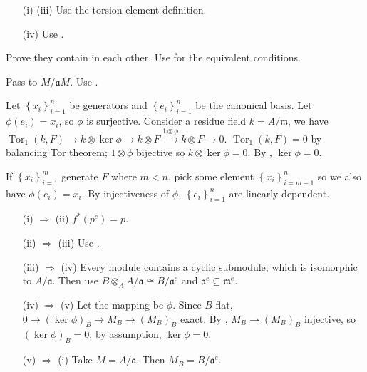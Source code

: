 \begin{exercise}\label{ex3.12}
	\begin{enumerate}
		\item[(i)-(iii)] Use the torsion element definition.
		\item[(iv)] Use .
	\end{enumerate}
\end{exercise}

\begin{exercise}\label{ex3.13}
	Prove they contain in each other. Use  for the equivalent conditions.
\end{exercise}

\begin{exercise}\label{ex3.14}
	Pass to $M/\mathfrak{a}M$. Use .
\end{exercise}

\begin{exercise}\label{ex3.15}
	Let $\left\{x_i\right\}_{i=1}^n$ be generators and $\left\{e_i\right\}_{i=1}^n$ be the canonical basis. Let $\phi(e_i)=x_i$, so $\phi$ is surjective. Consider a residue field $k=A/\mathfrak{m}$, we have $\operatorname{Tor}_1(k,F)\rightarrow k\otimes\ker\phi\rightarrow k\otimes F\xrightarrow{1\otimes\phi}k\otimes F\rightarrow0$. $\operatorname{Tor}_1(k,F)=0$ by balancing Tor theorem; $1\otimes\phi$ bijective so $k\otimes\ker\phi=0$. By , $\ker\phi=0$.
	
	If $\left\{x_i\right\}_{i=1}^m$ generate $F$ where $m<n$, pick some element $\left\{x_i\right\}_{i=m+1}^n$ so we also have $\phi(e_i)=x_i$. By injectiveness of $\phi$, $\left\{e_i\right\}_{i=1}^n$ are linearly dependent.
\end{exercise}

\begin{exercise}\label{ex3.16}
	\begin{enumerate}
		\item[(i) $\Rightarrow$ (ii)]$f^*\left(p^e\right)=p$.
		\item[(ii) $\Rightarrow$ (iii)] Use .
		\item[(iii) $\Rightarrow$ (iv)] Every module contains a cyclic submodule, which is isomorphic to $A/\mathfrak{a}$. Then use $B\otimes_AA/\mathfrak{a}\cong B/\mathfrak{a}^e$ and $\mathfrak{a}^e\subseteq\mathfrak{m}^e$.
		\item[(iv) $\Rightarrow$ (v)] Let the mapping be $\phi$. Since $B$ flat, $0\rightarrow(\ker\phi)_B\rightarrow M_B\rightarrow\left(M_B\right)_B$ exact. By , $M_B\rightarrow\left(M_B\right)_B$ injective, so $(\ker\phi)_B=0$; by assumption, $\ker\phi=0$.
		\item[(v) $\Rightarrow$ (i)] Take $M=A/\mathfrak{a}$. Then $M_B=B/\mathfrak{a}^e$.
	\end{enumerate}
\end{exercise}

